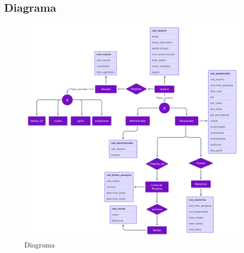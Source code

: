 \documentclass[11pt]{../../classes/ifscarticle}
\begin{document}
\subsection{Diagrama}
\begin{figure}[h]
    \centering
    \includegraphics[width=17cm]{figuras/Diagrama.png}
    \caption{Diagrama}
    \label{fig:logolatex}
\end{figure}
\clearpage



\end{document}
